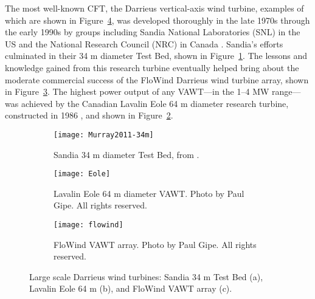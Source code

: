 The most well-known CFT, the Darrieus vertical-axis wind turbine, examples of
which are shown in Figure~\ref{fig:Darrieus}, was developed thoroughly in the
late 1970s through the early 1990s by groups including Sandia National
Laboratories (SNL) in the US and the National Research Council (NRC) in Canada
\cite{Para2002}. Sandia's efforts culminated in their 34 m diameter Test Bed,
shown in Figure~\ref{fig:Sandia-34m}. The lessons and knowledge gained from this
research turbine eventually helped bring about the moderate commercial success
of the FloWind Darrieus wind turbine array, shown in Figure~\ref{fig:FloWind}.
The highest power output of any VAWT---in the 1--4 MW range---was achieved by
the Canadian Lavalin Eole 64 m diameter research turbine, constructed in 1986
\cite{Para2002}, and shown in Figure~\ref{fig:Eole}.

\begin{figure}
    \centering

    \begin{subfigure}[b]{0.625\textwidth}
        \centering
        
        \texttt{[image: Murray2011-34m]}
        
        \caption{Sandia 34 m diameter Test Bed, from \cite{Murray2011}.}
        
        \label{fig:Sandia-34m}
    \end{subfigure}
    \hfill
    \begin{subfigure}[b]{0.352\textwidth}
        \centering
        
        \texttt{[image: Eole]}
        
        \caption{Lavalin Eole 64 m diameter VAWT. Photo by Paul Gipe. All rights
            reserved.}
        
        \label{fig:Eole}
    \end{subfigure}
    
    \begin{subfigure}[b]{0.8\textwidth}
        \centering
        
        \texttt{[image: flowind]}
        
        \caption{FloWind VAWT array. Photo by Paul Gipe. All rights reserved.}
        
        \label{fig:FloWind}
    \end{subfigure}
    
    \caption{Large scale Darrieus wind turbines: Sandia 34 m Test Bed (a),
        Lavalin Eole 64 m (b), and FloWind VAWT array (c).}
    
    \label{fig:Darrieus}
\end{figure}

